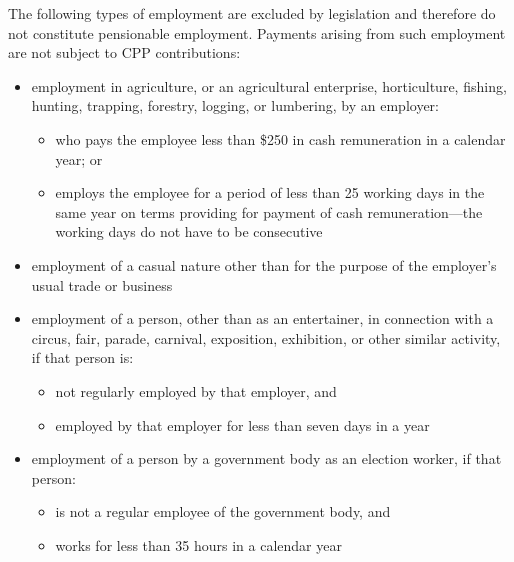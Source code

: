 \documentclass[letterpaper,10pt,english]{sphinxmanual}
\begin{document}
\sphinxAtStartPar
The following types of employment are excluded by legislation and therefore do not constitute pensionable employment. Payments arising from such employment are not subject
to CPP contributions:
\begin{itemize}
\item {} 
\sphinxAtStartPar
employment in agriculture, or an agricultural enterprise, horticulture, fishing, hunting, trapping, forestry, logging, or lumbering, by an employer:
\begin{itemize}
\item {} 
\sphinxAtStartPar
who pays the employee less than \$250 in cash remuneration in a calendar year; or

\item {} 
\sphinxAtStartPar
employs the employee for a period of less than 25 working days in the same year on terms providing for payment of cash remuneration—the working days do not have to be consecutive

\end{itemize}

\item {} 
\sphinxAtStartPar
employment of a casual nature other than for the purpose of the employer’s usual trade or business

\item {} 
\sphinxAtStartPar
employment of a person, other than as an entertainer, in connection with a circus, fair, parade, carnival, exposition, exhibition, or other similar activity, if that person is:
\begin{itemize}
\item {} 
\sphinxAtStartPar
not regularly employed by that employer, and

\item {} 
\sphinxAtStartPar
employed by that employer for less than seven days in a year

\end{itemize}

\item {} 
\sphinxAtStartPar
employment of a person by a government body as an election worker, if that person:
\begin{itemize}
\item {} 
\sphinxAtStartPar
is not a regular employee of the government body, and

\item {} 
\sphinxAtStartPar
works for less than 35 hours in a calendar year

\end{itemize}


\end{itemize}
\end{document}
